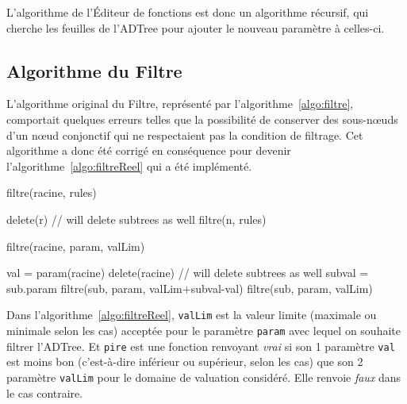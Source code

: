     L'algorithme de l'Éditeur de fonctions est donc un algorithme récursif, qui cherche les feuilles de l'ADTree pour ajouter le nouveau paramètre à celles-ci. 

\subsection{Algorithme du Filtre}
\label{ssec:implemFiltre}

L'algorithme original du Filtre, représenté par l'{\sc algorithme}~\ref{algo:filtre}, comportait quelques erreurs telles que la possibilité de conserver des sous-n\oe{}uds d'un n\oe{}ud conjonctif qui ne respectaient pas la condition de filtrage. Cet algorithme a donc été corrigé en conséquence pour devenir l'{\sc algorithme}~\ref{algo:filtreReel} qui a été implémenté.

 	\begin{algorithm}[H]
            \caption{filtre(racine, rules)}
            \label{algo:filtre}
            \begin{algorithmic}
                        \STATE delete(r) // will delete subtrees as well
                        \RETURN
                    \ENDIF
                \ENDFOR
                \STATE
                    \STATE filtre(n, rules)
                \ENDFOR
            \end{algorithmic}
        \end{algorithm}
        

 	\begin{algorithm}[H]
            \caption{filtre(racine, param, valLim)}
            \label{algo:filtreReel}
            \begin{algorithmic}
	\STATE val = param(racine)
	\STATE
		\STATE delete(racine) // will delete subtrees as well
		\RETURN
	\STATE
	\ELSE
				\STATE subval = sub.param
				\STATE filtre(sub, param, valLim+subval-val)
			\ENDFOR
		\ELSE
				\STATE filtre(sub, param, valLim)
			\ENDFOR
		\ENDIF
	\ENDIF
            \end{algorithmic}
        \end{algorithm}

    Dans l'{\sc algorithme}~\ref{algo:filtreReel}, \verb|valLim| est la valeur limite (maximale ou minimale selon les cas) acceptée pour le paramètre \verb|param| avec lequel on souhaite filtrer l'ADTree. Et \verb|pire| est une fonction renvoyant \emph{vrai} si son 1\ier{} paramètre \verb|val| est moins bon (c'est-à-dire inférieur ou supérieur, selon les cas) que son 2\ieme{} paramètre \verb|valLim| pour le domaine de valuation considéré. Elle renvoie \emph{faux} dans le cas contraire.

